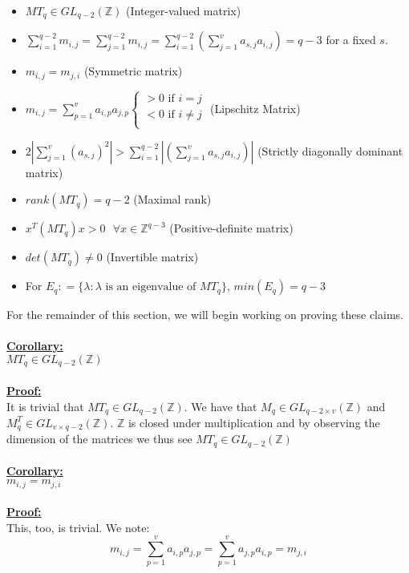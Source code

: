 \documentclass[11pt]{article}
\theoremstyle{plain}
\theoremstyle{definition}
\begin{document}
\begin{itemize}
	\item $MT_q \in GL_{q-2} (\mathbb{Z})$ (Integer-valued matrix)
	\item $\sum\limits_{i=1}^{q-2} m_{i,j} = \sum\limits_{j=1}^{q-2} m_{i,j} = \sum\limits_{i=1}^{q-2} (\sum\limits_{j=1}^{v} a_{s,j} a_{i,j} ) = q-3$ for a fixed $s$.
	\item $ m_{i,j} = m_{j,i}$ (Symmetric matrix)
	\item $
	m_{i,j} = \sum\limits_{p=1}^{v} a_{i,p} a_{j, p} 
	\begin{cases}
	> 0\text{ if }i = j \\
	< 0\text{ if }i \neq j\\
	\end{cases}
	$ (Lipschitz Matrix)
	\item $2 | \sum\limits_{j=1}^{v} ( a_{s,j} )^2 | > \sum\limits_{i=1}^{q-2} | ( \sum\limits_{j=1}^{v} a_{s,j} a_{i,j} ) |$ (Strictly diagonally dominant matrix)
	\item $ rank(MT_q) = q-2 $ (Maximal rank)
	\item $ x^T (MT_q) x > 0 \text{ } \forall x \in \mathbb{Z}^{q-3}$ (Positive-definite matrix)
	\item $det(MT_q) \neq 0 $ (Invertible matrix)
	\item For $E_q : = \{\lambda : \lambda \text{ is an eigenvalue of }MT_q \}$, $min(E_q) = q-3$
\end{itemize}
For the remainder of this section, we will begin working on proving these claims.\\
\\
\textbf{\underline{Corollary:}}\\
$MT_q \in GL_{q-2} (\mathbb{Z})$ \\
\\
\textbf{\underline{Proof:}}\\
It is trivial that $MT_q \in GL_{q-2} (\mathbb{Z})$. We have that $M_q \in GL_{q-2 \times v} (\mathbb{Z})$ and $M_q ^T \in GL_{v \times q-2} (\mathbb{Z})$. $\mathbb{Z}$ is closed under multiplication and by observing the dimension of the matrices we thus see $MT_q \in GL_{q-2} (\mathbb{Z})$ \\
\\
\textbf{\underline{Corollary:}}\\
$ m_{i,j} = m_{j,i}$  \\
\\
\textbf{\underline{Proof:}}\\
This, too, is trivial. We note: 
\begin{equation*}
	m_{i,j} = \sum\limits_{p=1}^{v} a_{i,p} a_{j, p} = \sum\limits_{p=1}^{v} a_{j, p} a_{i,p} = m_{j,i}
\end{equation*}
\end{document}
